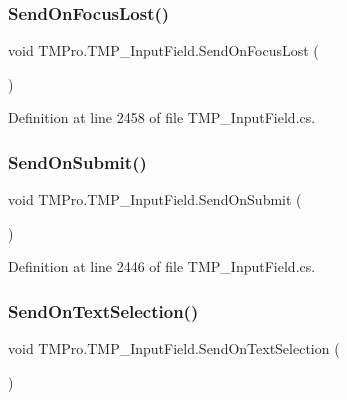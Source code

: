 \subsubsection{\texorpdfstring{SendOnFocusLost()}{SendOnFocusLost()}}
{\footnotesize\ttfamily void T\+M\+Pro.\+T\+M\+P\+\_\+\+Input\+Field.\+Send\+On\+Focus\+Lost (\begin{DoxyParamCaption}{ }\end{DoxyParamCaption})\hspace{0.3cm}{\ttfamily [protected]}}



Definition at line 2458 of file T\+M\+P\+\_\+\+Input\+Field.\+cs.

\mbox{\label{class_t_m_pro_1_1_t_m_p___input_field_abf60ea8cc14546e9e0ca9f88db152b13}} 
\subsubsection{\texorpdfstring{SendOnSubmit()}{SendOnSubmit()}}
{\footnotesize\ttfamily void T\+M\+Pro.\+T\+M\+P\+\_\+\+Input\+Field.\+Send\+On\+Submit (\begin{DoxyParamCaption}{ }\end{DoxyParamCaption})\hspace{0.3cm}{\ttfamily [protected]}}



Definition at line 2446 of file T\+M\+P\+\_\+\+Input\+Field.\+cs.

\mbox{\label{class_t_m_pro_1_1_t_m_p___input_field_a99c2a06204ab72d3bde231e3cca78254}} 
\subsubsection{\texorpdfstring{SendOnTextSelection()}{SendOnTextSelection()}}
{\footnotesize\ttfamily void T\+M\+Pro.\+T\+M\+P\+\_\+\+Input\+Field.\+Send\+On\+Text\+Selection (\begin{DoxyParamCaption}{ }\end{DoxyParamCaption})\hspace{0.3cm}{\ttfamily [protected]}}



